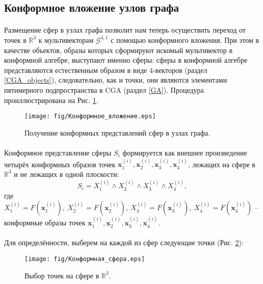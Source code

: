 \documentclass[12pt]{article}
\begin{document}
\newpage
\subsection{Конформное вложение узлов графа}
\paragraph{}
Размещение сфер в узлах графа позволит нам теперь осуществить переход от точек в $\mathds{R}^3$ к мультивекторам $\mathcal{G}^{4,1}$ с помощью конформного вложения. При этом в качестве объектов, образы которых сформируют искомый мультивектор в конформной алгебре, выступают именно сферы: сферы в конформной алгебре представляются естественным образом в виде $4$-векторов (раздел \ref{CGA_objects}), следовательно, как и точки, они являются элементами пятимерного подпространства в CGA (раздел \ref{GA}). Процедура проиллюстрирована на Рис. \ref{fig:conformal_embedding}.

\hspace{1cm}

\begin{figure}[h]
    \centering
    \texttt{[image: fig/Конформное\_вложение.eps]}
    \hspace{1cm}
    \caption{Получение конформных
    представлений сфер в узлах графа.}
    \label{fig:conformal_embedding}
\end{figure}

\paragraph{}
Конформное представление сферы $S_i$ формируется как внешнее произведение четырёх конформных образов точек $\mathbf{x}_1^{(i)}, \mathbf{x}_2^{(i)}, \mathbf{x}_3^{(i)}, \mathbf{x}_4^{(i)}$, лежащих на сфере в $\mathds{R}^3$ и не лежащих в одной плоскости:
$$S_i = X_1^{(i)} \wedge X_2^{(i)} \wedge X_3^{(i)} \wedge X_4^{(i)},$$ 
где $X_1^{(i)} = F(\mathbf{x}_1^{(i)}), \ X_2^{(i)} = F(\mathbf{x}_2^{(i)}), \ X_3^{(i)} = F(\mathbf{x}_3^{(i)}), \ X_4^{(i)} = F(\mathbf{x}_4^{(i)})$ -- конформные образы точек $\mathbf{x}_1^{(i)}, \mathbf{x}_2^{(i)}, \mathbf{x}_3^{(i)}, \mathbf{x}_4^{(i)}$.
\paragraph{}
Для определённости, выберем на каждой из сфер следующие точки (Рис. \ref{fig:conformal_sphere}):
\begin{figure}[h]
    \centering
    \texttt{[image: fig/Конформная\_сфера.eps]}

    \caption{Выбор точек на сфере в $\mathds{R}^3$.}
    \label{fig:conformal_sphere}
\end{figure}
\end{document}
